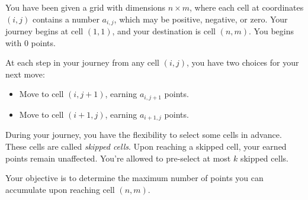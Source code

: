 You have been given a grid with dimensions $n \times m$, where each cell at coordinates $(i, j)$ contains a number $a_{i,j}$, which may be positive, negative, or zero. Your journey begins at cell $(1, 1)$, and your destination is cell $(n, m)$.
You begins with $0$ points.

At each step in your journey from any cell $(i, j)$, you have two choices for your next move:
\begin{itemize}
    \item Move to cell $(i, j + 1)$, earning $a_{i, j + 1}$ points.
    \item Move to cell $(i + 1, j)$, earning $a_{i + 1, j}$ points.
\end{itemize}
During your journey, you have the flexibility to select some cells in advance. These cells are called \textit{skipped cells}. Upon reaching a skipped cell, your earned points remain unaffected. You're allowed to pre-select at most $k$ skipped cells.

Your objective is to determine the maximum number of points you can accumulate upon reaching cell $(n, m)$.